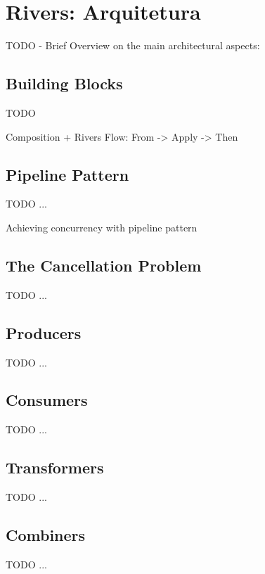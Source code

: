 \chapter{Rivers: Arquitetura}
\label{cha:rivers_architecture}

TODO - Brief Overview on the main architectural aspects:

\section{Building Blocks}
\label{sec:building_blocks}

TODO

Composition + Rivers Flow: From -> Apply -> Then

\section{Pipeline Pattern}
\label{sec:the_pipeline_pattern}

TODO ...

Achieving concurrency with pipeline pattern

\section{The Cancellation Problem}
\label{sec:the_cancellation_problem}

TODO ...

\section{Producers}
\label{sec:producers}

TODO ...

\section{Consumers}
\label{sec:consumers}

TODO ...

\section{Transformers}
\label{sec:transformers}

TODO ...

\section{Combiners}
\label{sec:combiners}

TODO ...

